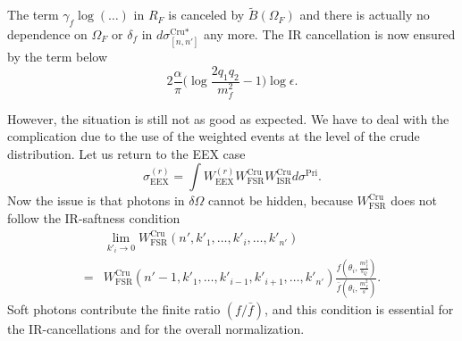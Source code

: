 The term $\gamma_f\log(\ldots)$ in $R_F$ is canceled by $\widetilde{B}(\Omega_F)$ and there is actually no dependence on $\Omega_F$ or $\delta_f$ in $d\sigma^{\text{Cru}\ast}_{[n,n']}$ any more. The IR cancellation is now ensured by the term below
\begin{equation*}
2\frac{\alpha}{\pi}\biggl(\log\frac{2q_1q_2}{m^2_f}-1\biggr)\log\epsilon.
\end{equation*}

However, the situation is still not as good as expected. We have to deal with the complication due to the use of the weighted events at the level of the crude distribution. Let us return to the EEX case
\begin{equation}
\sigma_\text{EEX}^{(r)}=\int W^{(r)}_\text{EEX}W^\text{Cru}_\text{FSR}W^\text{Cru}_\text{ISR}d\sigma^{\text{Pri}}.
\end{equation}
Now the issue is that photons in $\delta\Omega$ cannot be hidden, because $W^\text{Cru}_\text{FSR}$ does not follow the IR-saftness condition
\begin{align*}
&\lim_{k'_i\to 0}W^\text{Cru}_\text{FSR}(n',k'_1,\ldots,k'_i,\ldots,k'_{n'})\nonumber\\
=&W^\text{Cru}_\text{FSR}(n'-1,k'_1,\ldots,k'_{i-1},k'_{i+1},\ldots,k'_{n'})\frac{f\left(\theta_i,\frac{m_f^2}{s_Q}\right)}{\bar{f}\left(\theta_i,\frac{m_f^2}{s}\right)}.
\end{align*}
Soft photons contribute the finite ratio $(f/\bar{f})$, and this condition is essential for the IR-cancellations and for the overall normalization.

